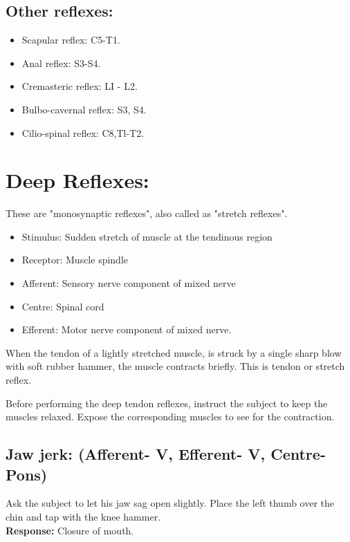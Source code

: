 \documentclass[a4paper,12pt]{book}
\begin{document}
\subsection*{Other reflexes:}
\begin{itemize}
\item{Scapular reflex: C5-T1.}
\item{Anal reflex: S3-S4.}
\item{Cremasteric reflex: LI - L2.}
\item{Bulbo-cavernal reflex: S3, S4.}
\item{Cilio-spinal reflex: C8,Tl-T2.}
\end{itemize}
\section*{Deep Reflexes:}
These are "monosynaptic reflexes", also called as "stretch reflexes".
\begin{itemize}
\item{Stimulus: Sudden stretch of muscle at the tendinous region}
\item{Receptor: Muscle spindle}
\item{Afferent: Sensory nerve component of mixed nerve}
\item{Centre: Spinal cord}
\item{Efferent: Motor nerve component of mixed nerve.}
\end{itemize}
\par
When the tendon of a lightly stretched muscle, is struck by a single sharp blow with soft rubber hammer, the muscle contracts briefly. This is tendon or stretch reflex.
\par
Before performing the deep tendon reflexes, instruct the subject to keep the muscles relaxed. Expose the corresponding muscles to see for the contraction.
\subsection*{Jaw jerk: (Afferent- V, Efferent- V, Centre-Pons)}
	Ask the subject to let his jaw sag open slightly. Place the left thumb over the chin and tap with the knee hammer.\\
\textbf{Response:} Closure of mouth.
\end{document}
